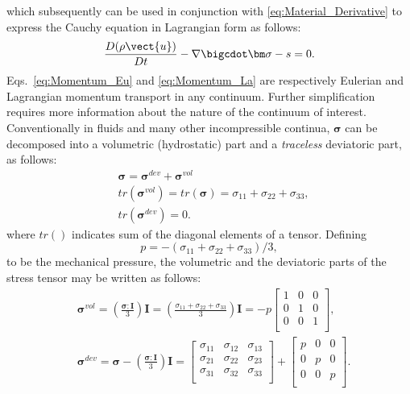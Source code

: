 which subsequently can be used in conjunction with \ref{eq:Material_Derivative} to express the Cauchy equation in Lagrangian form as follows:
\begin{align}
\frac{ D (\rho \vect{u})  }{D t}  -\nabla \bigcdot  \bm \sigma -s=0.
\label{eq:Momentum_La}
\end{align}
Eqs.~\ref{eq:Momentum_Eu} and \ref{eq:Momentum_La} are respectively  Eulerian and Lagrangian momentum transport in any continuum. Further simplification requires more information about the nature of the continuum of interest. 
Conventionally in fluids and many other incompressible continua, $\bm{\sigma}$ can be decomposed into a volumetric (hydrostatic) part and a \textit{traceless} deviatoric part, as follows:
\begin{align}
&\bm{\sigma}=\bm{\sigma}^{dev}+\bm{\sigma}^{vol}\label{eq:stress_decomp}\\
&tr(\bm{\sigma}^{vol})=tr(\bm{\sigma})=\sigma_{11}+\sigma_{22}+\sigma_{33},\\
&tr(\bm{\sigma}^{dev})=0.
\end{align}
where $tr( )$ indicates sum of the diagonal elements of a tensor. Defining 
\begin{equation}
p=-({\sigma_{11}+\sigma_{22}+\sigma_{33}})/{3},
\end{equation}
to be the mechanical pressure, the volumetric and the deviatoric parts of the stress tensor may be written as follows:
\begin{align}
&\bm{\sigma}^{vol}=(\frac{\bm{\sigma}: \mathbf{I}}{3}) \mathbf{I}=(\frac{\sigma_{11}+\sigma_{22}+\sigma_{33}}{3}) \mathbf{I}=
-p
\begin{bmatrix}
1& 0& 0\\
0&1&0\\
0&0&1\\
\end{bmatrix},\label{eq:sigma_vol}\\
&\bm{\sigma}^{dev}=\bm{\sigma}-(\frac{\bm{\sigma}: \mathbf{I}}{3}) \mathbf{I}=
\begin{bmatrix}
\sigma_{11}& \sigma_{12}& \sigma_{13}\\
\sigma_{21}& \sigma_{22}& \sigma_{23}\\
\sigma_{31}& \sigma_{32}& \sigma_{33}\\
\end{bmatrix}+
\begin{bmatrix}
p& 0& 0\\
0&p&0\\
0&0&p\\
\end{bmatrix}.
\label{eq:sigma_dev}
\end{align}
